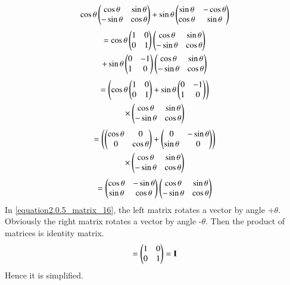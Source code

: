 \begin{align}
    \cos\theta\begin{pmatrix}\cos\theta & \sin\theta \\ -\sin\theta & \cos\theta\end{pmatrix}+\sin\theta\begin{pmatrix}\sin\theta & -\cos\theta \\ \cos\theta & \sin\theta\end{pmatrix}
\end{align}
\begin{multline}
    =\cos\theta\begin{pmatrix} 1 & 0 \\ 0 & 1\end{pmatrix}\begin{pmatrix}\cos\theta & \sin\theta \\ -\sin\theta & \cos\theta\end{pmatrix}\\+\sin\theta\begin{pmatrix} 0 & -1 \\ 1 & 0 \end{pmatrix}\begin{pmatrix}\cos\theta & \sin\theta \\ -\sin\theta & \cos\theta\end{pmatrix}
\end{multline}
\begin{multline}
    =\left(\cos\theta\begin{pmatrix} 1 & 0 \\ 0 & 1\end{pmatrix}+\sin\theta\begin{pmatrix} 0 & -1 \\ 1 & 0 \end{pmatrix}\right)\\\times\begin{pmatrix}\cos\theta & \sin\theta \\ -\sin\theta & \cos\theta\end{pmatrix}
\end{multline}
\begin{multline}
    =\left(\begin{pmatrix} \cos\theta & 0 \\ 0 & \cos\theta\end{pmatrix}+\begin{pmatrix} 0 & -\sin\theta \\ \sin\theta & 0 \end{pmatrix}\right)\\\times\begin{pmatrix}\cos\theta & \sin\theta \\ -\sin\theta & \cos\theta\end{pmatrix}
\end{multline}
\begin{align}\label{equation2.0.5_matrix_16}
    =\begin{pmatrix}\cos\theta & -\sin\theta \\ \sin\theta & \cos\theta\end{pmatrix}\begin{pmatrix}\cos\theta & \sin\theta \\ -\sin\theta & \cos\theta\end{pmatrix}
\end{align}
In \eqref{equation2.0.5_matrix_16}, the left matrix rotates a vector by angle +$\theta$. Obviously the right matrix rotates a vector by angle -$\theta$. Then the product of matrices is identity matrix.
\begin{align}
    =\begin{pmatrix} 1 & 0 \\ 0 & 1\end{pmatrix}=\mathbf{I}
\end{align}
Hence it is simplified.
